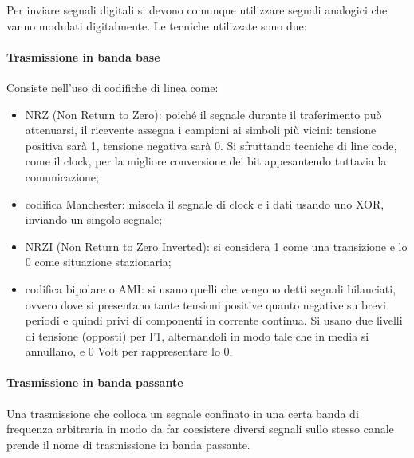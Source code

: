 \documentclass{subfiles}
\begin{document}
    Per inviare segnali digitali si devono comunque utilizzare segnali analogici che vanno modulati digitalmente. Le tecniche utilizzate 
    sono due:

    \paragraph*{Trasmissione in banda base}
    Consiste nell'uso di codifiche di linea come:
    \begin{itemize}
        \item NRZ (Non Return to Zero): poiché il segnale durante il traferimento può attenuarsi, il ricevente assegna i campioni ai 
        simboli più vicini: tensione positiva sarà 1, tensione negativa sarà 0. Si sfruttando tecniche di line code, come il clock, per 
        la migliore conversione dei bit appesantendo tuttavia la comunicazione;
        \item codifica Manchester: miscela il segnale di clock e i dati usando uno XOR, inviando un singolo segnale;
        \item NRZI (Non Return to Zero Inverted): si considera 1 come una transizione e lo 0 come situazione stazionaria;
        \item codifica bipolare o AMI: si usano quelli che vengono detti segnali bilanciati, ovvero dove si presentano tante tensioni 
        positive quanto negative su brevi periodi e quindi privi di componenti in corrente continua. Si usano due livelli di tensione 
        (opposti) per l'1, alternandoli in modo tale che in media si annullano, e 0 Volt per rappresentare lo 0.
    \end{itemize}

    \paragraph*{Trasmissione in banda passante}
    Una trasmissione che colloca un segnale confinato in una certa banda di frequenza arbitraria in modo da far coesistere diversi 
    segnali sullo stesso canale prende il nome di trasmissione in banda passante.
    
\end{document}
